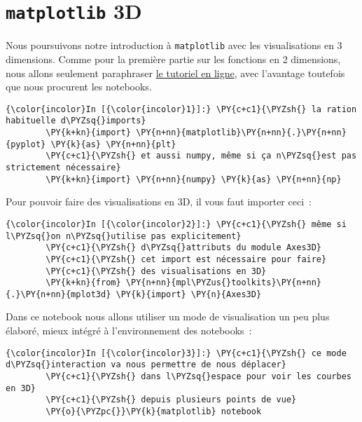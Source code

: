     
    
    
    

    

    \hypertarget{matplotlib-3d}{%
\section{\texorpdfstring{\texttt{matplotlib}
3D}{matplotlib 3D}}\label{matplotlib-3d}}

    Nous poursuivons notre introduction à \texttt{matplotlib} avec les
visualisations en 3 dimensions. Comme pour la première partie sur les
fonctions en 2 dimensions, nous allons seulement paraphraser
\href{https://matplotlib.org/mpl_toolkits/mplot3d/tutorial.html}{le
tutoriel en ligne}, avec l'avantage toutefois que nous procurent les
notebooks.

    \begin{Verbatim}[commandchars=\\\{\},frame=single,framerule=0.3mm,rulecolor=\color{cellframecolor}]
{\color{incolor}In [{\color{incolor}1}]:} \PY{c+c1}{\PYZsh{} la ration habituelle d\PYZsq{}imports}
        \PY{k+kn}{import} \PY{n+nn}{matplotlib}\PY{n+nn}{.}\PY{n+nn}{pyplot} \PY{k}{as} \PY{n+nn}{plt}
        \PY{c+c1}{\PYZsh{} et aussi numpy, même si ça n\PYZsq{}est pas strictement nécessaire}
        \PY{k+kn}{import} \PY{n+nn}{numpy} \PY{k}{as} \PY{n+nn}{np}
\end{Verbatim}


    Pour pouvoir faire des visualisations en 3D, il vous faut importer
ceci~:

    \begin{Verbatim}[commandchars=\\\{\},frame=single,framerule=0.3mm,rulecolor=\color{cellframecolor}]
{\color{incolor}In [{\color{incolor}2}]:} \PY{c+c1}{\PYZsh{} même si l\PYZsq{}on n\PYZsq{}utilise pas explicitement}
        \PY{c+c1}{\PYZsh{} d\PYZsq{}attributs du module Axes3D}
        \PY{c+c1}{\PYZsh{} cet import est nécessaire pour faire}
        \PY{c+c1}{\PYZsh{} des visualisations en 3D}
        \PY{k+kn}{from} \PY{n+nn}{mpl\PYZus{}toolkits}\PY{n+nn}{.}\PY{n+nn}{mplot3d} \PY{k}{import} \PY{n}{Axes3D}
\end{Verbatim}


    Dans ce notebook nous allons utiliser un mode de visualisation un peu
plus élaboré, mieux intégré à l'environnement des notebooks~:

    \begin{Verbatim}[commandchars=\\\{\},frame=single,framerule=0.3mm,rulecolor=\color{cellframecolor}]
{\color{incolor}In [{\color{incolor}3}]:} \PY{c+c1}{\PYZsh{} ce mode d\PYZsq{}interaction va nous permettre de nous déplacer}
        \PY{c+c1}{\PYZsh{} dans l\PYZsq{}espace pour voir les courbes en 3D}
        \PY{c+c1}{\PYZsh{} depuis plusieurs points de vue}
        \PY{o}{\PYZpc{}}\PY{k}{matplotlib} notebook
\end{Verbatim}


